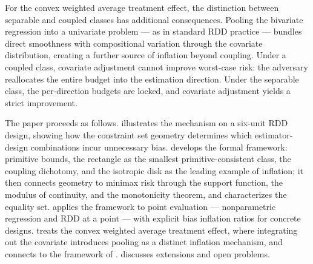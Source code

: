 For the convex weighted average treatment effect, the distinction between separable and coupled classes has additional consequences.
Pooling the bivariate regression into a univariate problem --- as in standard RDD practice --- bundles direct smoothness with compositional variation through the covariate distribution, creating a further source of inflation beyond coupling.
Under a coupled class, covariate adjustment cannot improve worst-case risk: the adversary reallocates the entire budget into the estimation direction.
Under the separable class, the per-direction budgets are locked, and covariate adjustment yields a strict improvement.

The paper proceeds as follows.
 illustrates the mechanism on a six-unit RDD design, showing how the constraint set geometry determines which estimator-design combinations incur unnecessary bias.
 develops the formal framework: primitive bounds, the rectangle as the smallest primitive-consistent class, the coupling dichotomy, and the isotropic disk as the leading example of inflation; it then connects geometry to minimax risk through the support function, the modulus of continuity, and the monotonicity theorem, and characterizes the equality set.
 applies the framework to point evaluation --- nonparametric regression and RDD at a point --- with explicit bias inflation ratios for concrete designs.
 treats the convex weighted average treatment effect, where integrating out the covariate introduces pooling as a distinct inflation mechanism, and connects to the framework of \textcite{imbens_optimized_2019}.
 discusses extensions and open problems.
